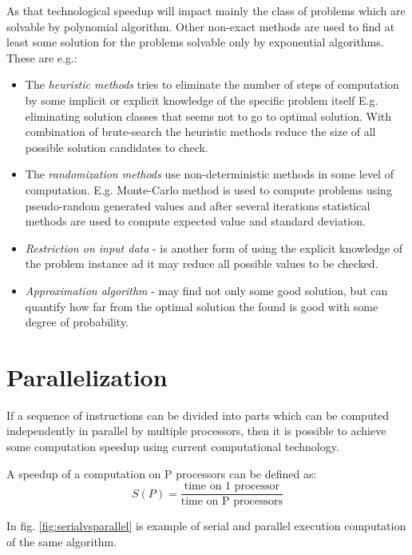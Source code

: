 As that technological speedup will impact mainly the class of problems which are solvable by polynomial algorithm. Other non-exact methods are used to find at least some solution for the problems solvable only by exponential algorithms. These are e.g.: 
\begin{itemize}
\item{The \emph{heuristic methods} tries to eliminate the number of steps of computation by some implicit or explicit knowledge of the specific problem itself E.g. eliminating solution classes that seems not to go to optimal solution. With combination of brute-search the heuristic methods reduce the size of all possible solution candidates to check.}
\item{The \emph{randomization methods} use non-deterministic methods in some level of computation. E.g. Monte-Carlo method is used to compute problems using pseudo-random generated values and after several iterations statistical methods are used to compute expected value and standard deviation. }
\item{\emph{Restriction on input data} - is another form of using the explicit knowledge of the problem instance ad it may reduce all possible values to be checked. }
\item{\emph{Approximation algorithm} - may find not only some good solution, but can quantify how far from the optimal solution the found is good with some degree of probability.}
\end{itemize}

\section{Parallelization}
\label{sec:introparalel}

If a sequence of instructions can be divided into parts which  can be computed independently in parallel by multiple processors, then it is possible to achieve some computation speedup using current computational technology. %

A speedup of a computation on P processors can be defined as:
\begin{equation}\label{eq:speedup}
 S(P) = \frac{\text{time on 1 processor}}{\text{time on P processors}}
 \end{equation}

In fig. \ref{fig:serialvsparallel} is example of serial and parallel execution computation of the same algorithm.

